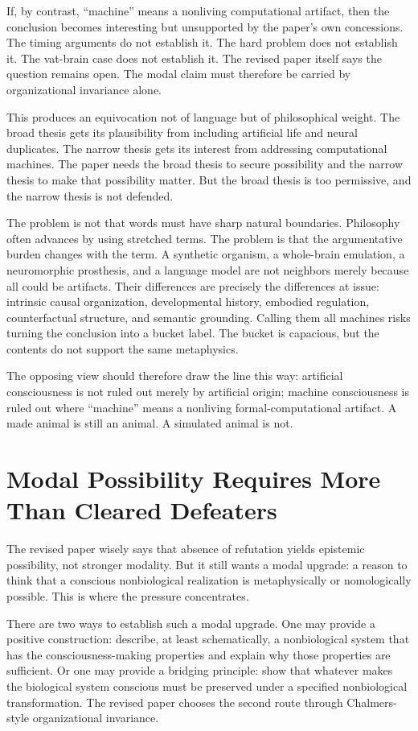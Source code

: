 \documentclass[11pt]{article}
\begin{document}
If, by contrast, ``machine'' means a nonliving computational artifact, then the conclusion becomes interesting but unsupported by the paper's own concessions. The timing arguments do not establish it. The hard problem does not establish it. The vat-brain case does not establish it. The revised paper itself says the question remains open. The modal claim must therefore be carried by organizational invariance alone.

This produces an equivocation not of language but of philosophical weight. The broad thesis gets its plausibility from including artificial life and neural duplicates. The narrow thesis gets its interest from addressing computational machines. The paper needs the broad thesis to secure possibility and the narrow thesis to make that possibility matter. But the broad thesis is too permissive, and the narrow thesis is not defended.

The problem is not that words must have sharp natural boundaries. Philosophy often advances by using stretched terms. The problem is that the argumentative burden changes with the term. A synthetic organism, a whole-brain emulation, a neuromorphic prosthesis, and a language model are not neighbors merely because all could be artifacts. Their differences are precisely the differences at issue: intrinsic causal organization, developmental history, embodied regulation, counterfactual structure, and semantic grounding. Calling them all machines risks turning the conclusion into a bucket label. The bucket is capacious, but the contents do not support the same metaphysics.

The opposing view should therefore draw the line this way: artificial consciousness is not ruled out merely by artificial origin; machine consciousness is ruled out where ``machine'' means a nonliving formal-computational artifact. A made animal is still an animal. A simulated animal is not.

\section{Modal Possibility Requires More Than Cleared Defeaters}

The revised paper wisely says that absence of refutation yields epistemic possibility, not stronger modality. But it still wants a modal upgrade: a reason to think that a conscious nonbiological realization is metaphysically or nomologically possible. This is where the pressure concentrates.

There are two ways to establish such a modal upgrade. One may provide a positive construction: describe, at least schematically, a nonbiological system that has the consciousness-making properties and explain why those properties are sufficient. Or one may provide a bridging principle: show that whatever makes the biological system conscious must be preserved under a specified nonbiological transformation. The revised paper chooses the second route through Chalmers-style organizational invariance.
\end{document}
